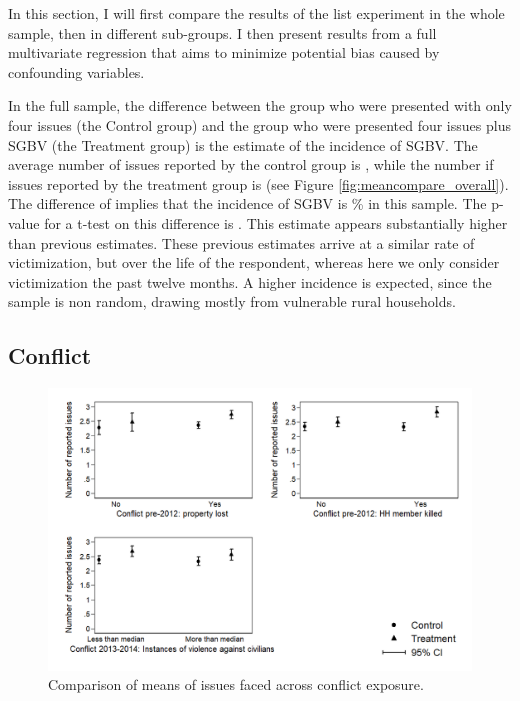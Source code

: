 In this section, I will first compare the results of the list experiment in the whole sample, then in different sub-groups. I then present results from a full multivariate regression that aims to minimize potential bias caused by confounding variables. 

In the full sample, the difference between the group who were presented with only four issues (the Control group) and the group who were presented four issues plus SGBV (the Treatment group) is the estimate of the incidence of SGBV. The average number of issues reported by the control group is , while the number if issues reported by the treatment group is  (see Figure \ref{fig:meancompare_overall}). The difference of  implies that the incidence of SGBV is \% in this sample. The p-value for a t-test on this difference is . This estimate appears substantially higher than previous estimates. These previous estimates \citep[e.g.][]{Peterson2018,Stark2017,Johnson2010} arrive at a similar rate of victimization, but over the life of the respondent, whereas here we only consider victimization the past twelve months. A higher incidence is expected, since the sample is non random, drawing mostly from vulnerable rural households. 

\subsection{Conflict} 

\begin{figure}[htb]
  \includegraphics[width=\linewidth]{chapters/congogbv/figures/meancompare_conf.png}
  \caption{Comparison of means of issues faced across conflict exposure.}
  \label{fig:meancompare_conf}
\end{figure}

